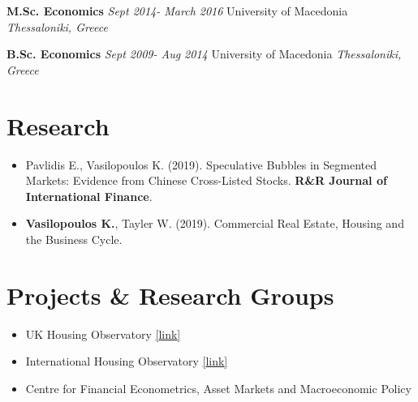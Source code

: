 \documentclass[10pt,]{article}
\begin{document}
              \textbf{M.Sc. Economics} \hfill  { \emph{Sept 2014- March 2016} }
              \newline  University of Macedonia \hfill { \emph{Thessaloniki, Greece} }
              
              \textbf{B.Sc. Economics} \hfill  { \emph{Sept 2009- Aug 2014} }
              \newline  University of Macedonia \hfill { \emph{Thessaloniki, Greece} }
              
              \hypertarget{research}{%
              \section{Research}\label{research}}
              
              \begin{itemize}
              \item
                Pavlidis E., Vasilopoulos K. (2019). Speculative Bubbles in Segmented
                Markets: Evidence from Chinese Cross-Listed Stocks. \textbf{R\&R
                Journal of International Finance}.
              \item
                \textbf{Vasilopoulos K.}, Tayler W. (2019). Commercial Real Estate,
                Housing and the Business Cycle.
              \end{itemize}
              
              \hypertarget{projects-research-groups}{%
              \section{Projects \& Research Groups}\label{projects-research-groups}}
              
              \begin{itemize}
              \item
                UK Housing Observatory
                \href{http://www.lancaster.ac.uk/lums/economics/research/housing/}{{[}link{]}}
              \item
                International Housing Observatory
                \href{https://lancs-macro.shinyapps.io/international-housing-observatory/}{{[}link{]}}
              \item
                Centre for Financial Econometrics, Asset Markets and Macroeconomic
                Policy
              \end{itemize}
              
\end{document}
